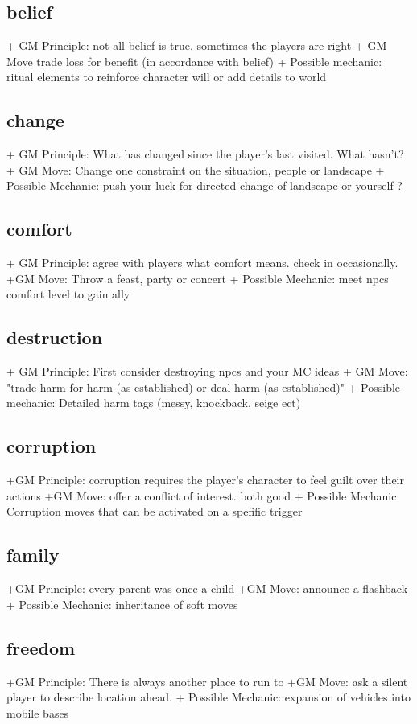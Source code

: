 \documentclass{tufte-handout}
\begin{document}
\subsection{belief}
+ GM Principle: not all belief is true. sometimes the players are right
+ GM Move trade loss for benefit (in accordance with belief)
+ Possible mechanic: ritual elements to reinforce character will or add details to world

\subsection{change}
+ GM Principle: What has changed since the player's last visited. What hasn't?	
+ GM Move: Change one constraint on the situation, people or landscape
+ Possible Mechanic: push your luck for directed change of landscape or yourself ?

\subsection{comfort}
+ GM Principle: agree with players what comfort means. check in occasionally.
+GM Move: Throw a feast, party or concert
+ Possible Mechanic: meet npcs comfort level to gain ally

\subsection{destruction }
+ GM Principle: First consider destroying npcs and your MC ideas	
+ GM Move: "trade harm for harm (as established) or deal harm (as established)"	
+ Possible mechanic: Detailed harm tags (messy, knockback, seige ect)


\subsection{corruption}
+GM Principle: corruption requires the player's character to feel guilt over their actions	
+GM Move:  offer a conflict of interest. both good	
+ Possible Mechanic: Corruption moves that can be activated on a spefific trigger

\subsection{family}
+GM Principle: every parent was once a child
+GM Move: 	announce a flashback
+ Possible Mechanic: 	inheritance of soft moves

\subsection{freedom}
+GM Principle:  There is always another place to run to
+GM Move:  ask a silent player to describe location ahead.
+ Possible Mechanic: expansion of vehicles into mobile bases 
\end{document}
